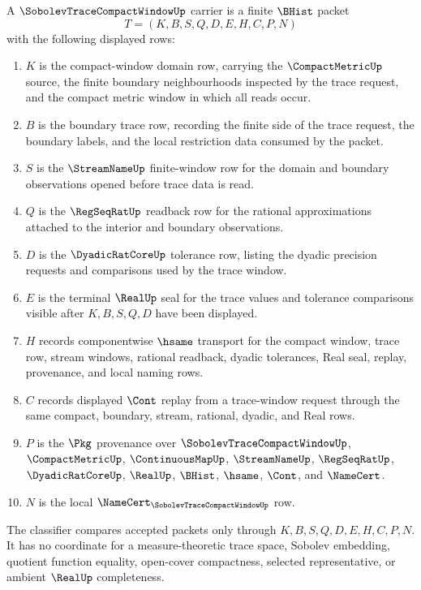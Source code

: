 \begin{definition}
\label{def:sobolev-trace-compact-window-carrier}
A $\SobolevTraceCompactWindowUp$ carrier is a finite $\BHist$ packet
$$
T=(K,B,S,Q,D,E,H,C,P,N)
$$
with the following displayed rows:
\begin{enumerate}
\item $K$ is the compact-window domain row, carrying the $\CompactMetricUp$ source, the finite boundary neighbourhoods inspected by the trace request, and the compact metric window in which all reads occur.
\item $B$ is the boundary trace row, recording the finite side of the trace request, the boundary labels, and the local restriction data consumed by the packet.
\item $S$ is the $\StreamNameUp$ finite-window row for the domain and boundary observations opened before trace data is read.
\item $Q$ is the $\RegSeqRatUp$ readback row for the rational approximations attached to the interior and boundary observations.
\item $D$ is the $\DyadicRatCoreUp$ tolerance row, listing the dyadic precision requests and comparisons used by the trace window.
\item $E$ is the terminal $\RealUp$ seal for the trace values and tolerance comparisons visible after $K,B,S,Q,D$ have been displayed.
\item $H$ records componentwise $\hsame$ transport for the compact window, trace row, stream windows, rational readback, dyadic tolerances, Real seal, replay, provenance, and local naming rows.
\item $C$ records displayed $\Cont$ replay from a trace-window request through the same compact, boundary, stream, rational, dyadic, and Real rows.
\item $P$ is the $\Pkg$ provenance over $\SobolevTraceCompactWindowUp$, $\CompactMetricUp$, $\ContinuousMapUp$, $\StreamNameUp$, $\RegSeqRatUp$, $\DyadicRatCoreUp$, $\RealUp$, $\BHist$, $\hsame$, $\Cont$, and $\NameCert$.
\item $N$ is the local $\NameCert_{\SobolevTraceCompactWindowUp}$ row.
\end{enumerate}
The classifier compares accepted packets only through $K,B,S,Q,D,E,H,C,P,N$. It has no coordinate for a measure-theoretic trace space, Sobolev embedding, quotient function equality, open-cover compactness, selected representative, or ambient $\RealUp$ completeness.
\end{definition}

